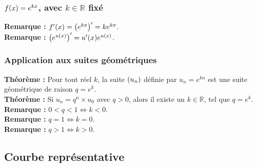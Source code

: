 \documentclass[a4paper,titlepage]{article}
\let\oldleft\left
\renewcommand{\left}{\mathopen{}\mathclose\bgroup\oldleft}
\let\oldright\right
\renewcommand{\right}{\aftergroup\egroup\oldright}
\begin{document}
        \subsubsection[$f\left(x\right)=e^{kx}$, avec $k\in\mathbb{R}$ fixé]{\boldmath$f\left(x\right)=e^{kx}$, avec $k\in\mathbb{R}$ fixé}
            \textbf{Remarque :} $f^{\prime}\left(x\right)=\left(e^{kx}\right)^{\prime}=ke^{kx}$.
            \\
            \textbf{Remarque :} $\left(e^{u\left(x\right)}\right)^{\prime}=u^{\prime}\left(x\right)e^{u\left(x\right)}$.
        \subsubsection{Application aux suites géométriques}
            \textbf{Théorème :} Pour tout réel $k$, la suite $\left(u_{n}\right)$ définie par $u_{n}=e^{kn}$ est une suite géométrique de raison $q=e^{k}$.
            \\
            \textbf{Théorème :} Si $u_{n}=q^{n}\times u_{0}$ avec $q>0$, alors il existe un $k\in\mathbb{R}$, tel que $q=e^{k}$.
            \\
            \textbf{Remarque :} $0<q<1\Leftrightarrow k<0$.
            \\
            \textbf{Remarque :} $q=1\Leftrightarrow k=0$.
            \\
            \textbf{Remarque :} $q>1\Leftrightarrow k>0$.
    \subsection{Courbe représentative}
        \begin{center}
        \end{center}
\end{document}
